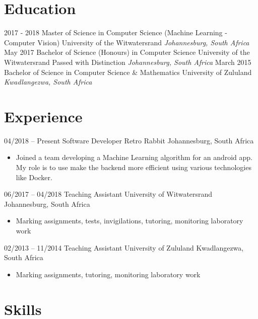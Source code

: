 \documentclass[letterpaper]{moderncv}        %
\begin{document}
\makecvtitle

%

\section{Education}
\cventry
{2017 - 2018}
{Master of Science in Computer Science (Machine Learning - Computer Vision)}
{University of the Witwatersrand}
{}
{\textit{Johannesburg, South Africa}}
{}
\cventry
{May 2017}
{Bachelor of Science (Honours) in Computer Science}
{University of the Witwatersrand}
{Passed with Distinction}
{\textit{Johannesburg, South Africa}}
{}
\cventry
{March 2015}
{Bachelor of Science in Computer Science \& Mathematics}
{University of Zululand}
{}
{\textit{Kwadlangezwa, South Africa}}
{}
\section{Experience}
\cventry
{04/2018 -- Present}
{Software Developer}
{Retro Rabbit}
{Johannesburg, South Africa}
{}
{\begin{itemize}%
		\item Joined a team developing a Machine Learning algorithm for an android app. My role is to use make the backend more efficient using various technologies like Docker. 
	\end{itemize}}
\cventry
{06/2017 -- 04/2018}
{Teaching Assistant}
{University of Witwatersrand}
{Johannesburg, South Africa}
{}
{\begin{itemize}%
	\item Marking assignments, tests, invigilations, tutoring, monitoring laboratory work
	\end{itemize}}
\cventry
{02/2013 -- 11/2014}
{Teaching Assistant}
{University of Zululand}
{Kwadlangezwa, South Africa}
{}
{\begin{itemize}%
	\item Marking assignments, tutoring, monitoring laboratory work
	\end{itemize}}
\section{Skills}
\end{document}
